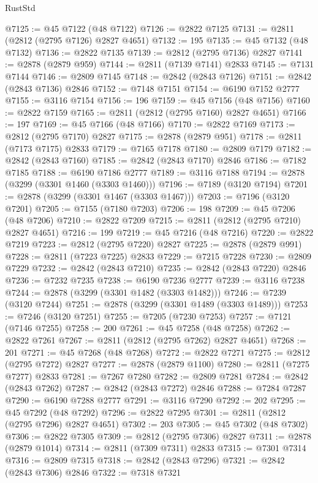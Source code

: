 \begin{lexlean}{RustStd}
\begin{coremodule}
@7125 := @45 @7122 (@48 @7122)
@7126 := @2822 @7125
@7131 := @2811 (@2812 (@2795 @7126) @2827 @4651)
@7132 := 195
@7135 := @45 @7132 (@48 @7132)
@7136 := @2822 @7135
@7139 := @2812 (@2795 @7136) @2827
@7141 := @2878 (@2879 @959)
@7144 := @2811 (@7139 @7141) @2833
@7145 := @7131 @7144
@7146 := @2809 @7145
@7148 := @2842 (@2843 @7126)
@7151 := @2842 (@2843 @7136) @2846
@7152 := @7148 @7151
@7154 := @6190 @7152 @2777
@7155 := @3116 @7154
@7156 := 196
@7159 := @45 @7156 (@48 @7156)
@7160 := @2822 @7159
@7165 := @2811 (@2812 (@2795 @7160) @2827 @4651)
@7166 := 197
@7169 := @45 @7166 (@48 @7166)
@7170 := @2822 @7169
@7173 := @2812 (@2795 @7170) @2827
@7175 := @2878 (@2879 @951)
@7178 := @2811 (@7173 @7175) @2833
@7179 := @7165 @7178
@7180 := @2809 @7179
@7182 := @2842 (@2843 @7160)
@7185 := @2842 (@2843 @7170) @2846
@7186 := @7182 @7185
@7188 := @6190 @7186 @2777
@7189 := @3116 @7188
@7194 := @2878 (@3299 (@3301 @1460 (@3303 @1460)))
@7196 := @7189 (@3120 @7194)
@7201 := @2878 (@3299 (@3301 @1467 (@3303 @1467)))
@7203 := @7196 (@3120 @7201)
@7205 := @7155 (@7180 @7203)
@7206 := 198
@7209 := @45 @7206 (@48 @7206)
@7210 := @2822 @7209
@7215 := @2811 (@2812 (@2795 @7210) @2827 @4651)
@7216 := 199
@7219 := @45 @7216 (@48 @7216)
@7220 := @2822 @7219
@7223 := @2812 (@2795 @7220) @2827
@7225 := @2878 (@2879 @991)
@7228 := @2811 (@7223 @7225) @2833
@7229 := @7215 @7228
@7230 := @2809 @7229
@7232 := @2842 (@2843 @7210)
@7235 := @2842 (@2843 @7220) @2846
@7236 := @7232 @7235
@7238 := @6190 @7236 @2777
@7239 := @3116 @7238
@7244 := @2878 (@3299 (@3301 @1482 (@3303 @1482)))
@7246 := @7239 (@3120 @7244)
@7251 := @2878 (@3299 (@3301 @1489 (@3303 @1489)))
@7253 := @7246 (@3120 @7251)
@7255 := @7205 (@7230 @7253)
@7257 := @7121 (@7146 @7255)
@7258 := 200
@7261 := @45 @7258 (@48 @7258)
@7262 := @2822 @7261
@7267 := @2811 (@2812 (@2795 @7262) @2827 @4651)
@7268 := 201
@7271 := @45 @7268 (@48 @7268)
@7272 := @2822 @7271
@7275 := @2812 (@2795 @7272) @2827
@7277 := @2878 (@2879 @1100)
@7280 := @2811 (@7275 @7277) @2833
@7281 := @7267 @7280
@7282 := @2809 @7281
@7284 := @2842 (@2843 @7262)
@7287 := @2842 (@2843 @7272) @2846
@7288 := @7284 @7287
@7290 := @6190 @7288 @2777
@7291 := @3116 @7290
@7292 := 202
@7295 := @45 @7292 (@48 @7292)
@7296 := @2822 @7295
@7301 := @2811 (@2812 (@2795 @7296) @2827 @4651)
@7302 := 203
@7305 := @45 @7302 (@48 @7302)
@7306 := @2822 @7305
@7309 := @2812 (@2795 @7306) @2827
@7311 := @2878 (@2879 @1014)
@7314 := @2811 (@7309 @7311) @2833
@7315 := @7301 @7314
@7316 := @2809 @7315
@7318 := @2842 (@2843 @7296)
@7321 := @2842 (@2843 @7306) @2846
@7322 := @7318 @7321

\end{coremodule}
\end{lexlean}
